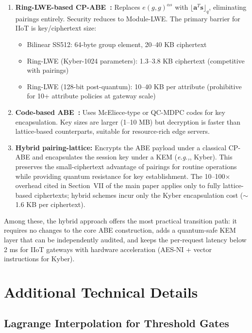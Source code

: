 \documentclass[lettersize,journal]{IEEEtran}
\newcommand{\eg}{\textit{e.g.,}}
\begin{document}
\begin{enumerate}
    \item \textbf{Ring-LWE-based CP-ABE~\cite{Gasparini2026_LatticeBenchmark, Purnima2025_PQSurvey}:}
    Replaces $e(g,g)^{\alpha s}$ with $\lfloor \mathbf{a}^T \mathbf{s} \rfloor_q$,
    eliminating pairings entirely. Security reduces to Module-LWE.
    The primary barrier for IIoT is key/ciphertext size:
    \begin{itemize}
        \item Bilinear SS512: 64-byte group element, 20--40 KB ciphertext
        \item Ring-LWE (Kyber-1024 parameters): 1.3--3.8 KB ciphertext
        (competitive with pairings)
        \item Ring-LWE (128-bit post-quantum): 10--40 KB per attribute
        (prohibitive for 10+ attribute policies at gateway scale)
    \end{itemize}
    \item \textbf{Code-based ABE~\cite{Poomekum2025_Lattice}:}
    Uses McEliece-type or QC-MDPC codes for key encapsulation.
    Key sizes are larger (1--10 MB) but decryption is faster than
    lattice-based counterparts, suitable for resource-rich edge servers.
    \item \textbf{Hybrid pairing-lattice:}
    Encrypts the ABE payload under a classical CP-ABE and encapsulates
    the session key under a KEM (\eg, Kyber). This preserves the
    small-ciphertext advantage of pairings for routine operations while
    providing quantum resistance for key establishment. The 10--100$\times$
    overhead cited in Section~VII of the main paper applies only to
    fully lattice-based ciphertexts; hybrid schemes incur only the
    Kyber encapsulation cost ($\sim$1.6 KB per ciphertext).
\end{enumerate}

Among these, the hybrid approach offers the most practical transition
path: it requires no changes to the core ABE construction, adds a
quantum-safe KEM layer that can be independently audited, and keeps
the per-request latency below 2 ms for IIoT gateways with hardware
acceleration (AES-NI + vector instructions for Kyber).

\section{Additional Technical Details}

\subsection{Lagrange Interpolation for Threshold Gates}
\end{document}
